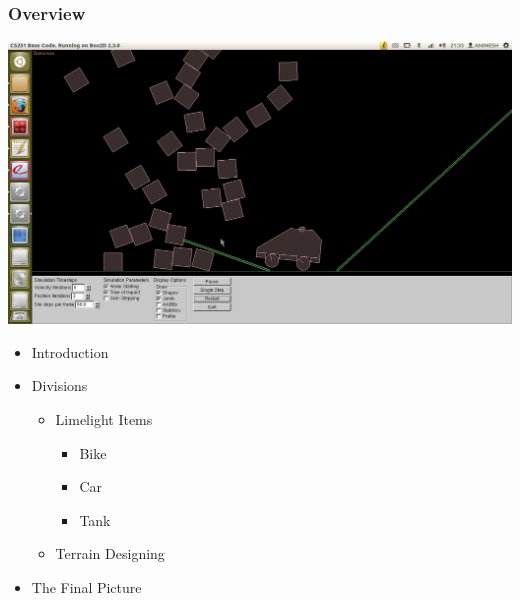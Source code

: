 \begin{frame}

\frametitle{Overview}
\begin{minipage}{0.5\textwidth}
\includegraphics[height=1.0\textwidth,width=1.0\textwidth,right]{./Screenshots/title.png} \pause
\end{minipage}
\begin{minipage}{0.4\textwidth}
\begin{itemize}
  \item Introduction\pause
  \item Divisions \pause
    \begin{itemize}
      \item Limelight Items \pause
        \begin{itemize}
        \item Bike 
        \item Car 
        \item Tank \pause
	\end{itemize}  
      \item Terrain Designing \pause
    \end{itemize}
  \item The Final Picture 
\end{itemize}
\end{minipage}
\end{frame}

